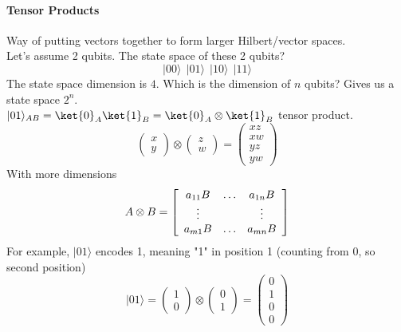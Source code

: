\documentclass[10pt]{report}
\begin{document}
\paragraph{Tensor Products} Way of putting vectors together to form larger Hilbert/vector spaces.\\
Let's assume 2 qubits. The state space of these 2 qubits?
$$|00\rangle\:\:|01\rangle\:\:|10\rangle\:\:|11\rangle$$
The state space dimension is $4$. Which is the dimension of $n$ qubits? Gives us a state space $2^n$.\\
$|01\rangle_{AB} = \ket{0}_A\ket{1}_B = \ket{0}_A\otimes\ket{1}_B$ tensor product.
$$\left(\begin{array}{c}
x\\y
\end{array}\right)\otimes\left(\begin{array}{c}
z\\w
\end{array}\right) = \left(\begin{array}{c}
xz\\xw\\yz\\yw
\end{array}\right)$$
With more dimensions
$$A\otimes B = \left[\begin{array}{c c c}
a_{11}B & \ldots & a_{1n}B\\
\vdots & & \vdots\\
a_{m1}B & \ldots & a_{mn}B
\end{array}\right]$$
For example, $|01\rangle$ encodes 1, meaning "1" in position 1 (counting from 0, so second position)
$$|01\rangle = \left(\begin{array}{c}
1\\0
\end{array}\right)\otimes\left(\begin{array}{c}
0\\1
\end{array}\right) = \left(\begin{array}{c}
0\\1\\0\\0
\end{array}\right)$$
\end{document}
